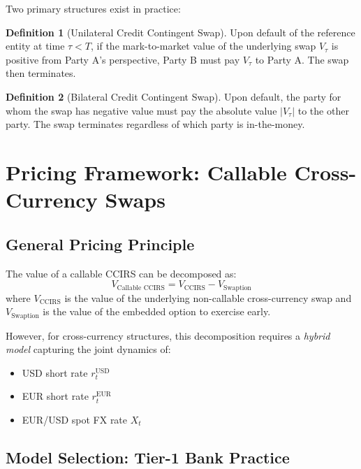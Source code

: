 \documentclass[11pt,a4paper]{article}
\theoremstyle{definition}
\newtheorem{definition}{Definition}[section]
\begin{document}
Two primary structures exist in practice:

\begin{definition}[Unilateral Credit Contingent Swap]
Upon default of the reference entity at time $\tau < T$, if the mark-to-market value of the underlying swap $V_{\tau}$ is positive from Party A's perspective, Party B must pay $V_{\tau}$ to Party A. The swap then terminates.
\end{definition}

\begin{definition}[Bilateral Credit Contingent Swap]
Upon default, the party for whom the swap has negative value must pay the absolute value $|V_{\tau}|$ to the other party. The swap terminates regardless of which party is in-the-money.
\end{definition}

\section{Pricing Framework: Callable Cross-Currency Swaps}

\subsection{General Pricing Principle}

The value of a callable CCIRS can be decomposed as:
\begin{equation}
V_{\text{Callable CCIRS}} = V_{\text{CCIRS}} - V_{\text{Swaption}}
\end{equation}
where $V_{\text{CCIRS}}$ is the value of the underlying non-callable cross-currency swap and $V_{\text{Swaption}}$ is the value of the embedded option to exercise early.

However, for cross-currency structures, this decomposition requires a \textit{hybrid model} capturing the joint dynamics of:
\begin{itemize}
    \item USD short rate $r^{\text{USD}}_t$
    \item EUR short rate $r^{\text{EUR}}_t$
    \item EUR/USD spot FX rate $X_t$
\end{itemize}

\subsection{Model Selection: Tier-1 Bank Practice}
\end{document}
